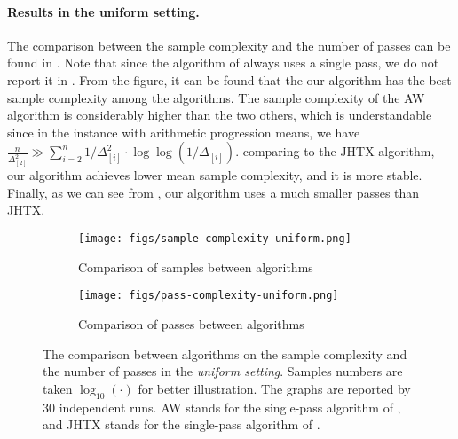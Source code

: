 \paragraph{Results in the uniform setting.} The comparison between the sample complexity and the number of passes can be found in . Note that since the algorithm of \cite{AssadiW20} always uses a single pass, we do not report it in . From the figure, it can be found that the our algorithm has the best sample complexity among the algorithms. The sample complexity of the AW algorithm is considerably higher than the two others, which is understandable since in the instance with arithmetic progression means, we have $\frac{n}{\Delta^2_{[2]}} \gg \sum_{i=2}^{n}1/\Delta^2_{[i]}\cdot \log\log(1/\Delta_{[i]})$. comparing to the JHTX algorithm, our algorithm achieves lower mean sample complexity, and it is more stable. Finally, as we can see from , our algorithm uses a much smaller passes than JHTX.

\begin{figure}
	\centering
	\begin{subfigure}{0.5\textwidth}
		\centering
		\texttt{[image: figs/sample-complexity-uniform.png]}
		\caption{Comparison of samples between algorithms}
		\label{fig:uniform-exp-sample}
	\end{subfigure}%
	\begin{subfigure}{0.5\textwidth}
		\centering
		\texttt{[image: figs/pass-complexity-uniform.png]}
		\caption{Comparison of passes between algorithms}
		\label{fig:uniform-exp-pass}
	\end{subfigure}
	\caption{The comparison between algorithms on the sample complexity and the number of passes in the \emph{uniform setting}. Samples numbers are taken $\log_{10}(\cdot)$ for better illustration. The graphs are reported by $30$ independent runs. AW stands for the single-pass algorithm of \cite{AssadiW20}, and JHTX stands for the single-pass algorithm of \cite{JinH0X21}.}
	\label{fig:experiments-uniform}
\end{figure}


